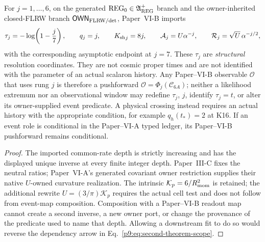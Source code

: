 \documentclass[12pt,a4paper]{article}
\begin{document}
\begin{proposition}
\label{p9:prop:hierarchy-non-reselection}
For \(j=1,\ldots,6\), on the generated
\(\mathrm{REG}_0\in\mathfrak A_{\rm REG}^{+}\) branch and the owner-inherited
closed-FLRW branch \(\mathsf{OWN}_{\rm FLRW/det}\), Paper~VI-B imports
\begin{equation}
 \tau_j=-\log\!\left(1-\frac j7\right),
 \qquad
 q_j=j,
 \qquad
 {\ensuremath{K_{\mathrm{sh}}}}_j=8j,
 \qquad
 \mathcal A_j=U\alpha^{-j},
 \qquad
 \mathcal R_j=\sqrt U\,\alpha^{-j/2},
\end{equation}
with the corresponding asymptotic endpoint at \(j=7\).  These
\(\tau_j\) are \emph{structural} resolution coordinates.  They are not cosmic
proper times and are not identified with the parameter of an actual scalaron
history.  Any Paper--VI-B observable \(\mathcal O\) that uses rung \(j\) is
therefore a pushforward \(\mathcal O=\Phi_j(\mathcal C_{6A})\); neither a
likelihood extremum nor an observational window may redefine \(\tau_j\),
\(j\), identify \(\tau_j=t\), or alter its owner-supplied event predicate.  A
physical crossing instead requires an actual history with the appropriate
condition, for example \(q_h(t_*)=2\) at K16.  If an event role is conditional
in the Paper--VI-A typed ledger, its Paper--VI-B pushforward remains conditional.
\end{proposition}

\begin{proof}
The imported common-rate depth is strictly increasing and has the displayed
unique inverse at every finite integer depth.  Paper~III-C fixes the neutral
ratios; Paper~VI-A's generated covariant owner restriction supplies their native
\(U\)-owned curvature realization.  The intrinsic $\mathcal K_p=6/R_{\mathrm{mom}}^2$ is retained; the additional rewrite $U=(3/\pi)\mathcal K_p$ requires the actual cell test and does not follow from event-map composition.
Composition with a Paper--VI-B readout map cannot create a second inverse, a new
owner port, or change the provenance of the predicate used to name that depth.
Allowing a downstream fit to do so would reverse the dependency arrow in
Eq.~\eqref{p9:eq:second-theorem-scope}.
\end{proof}
\end{document}
